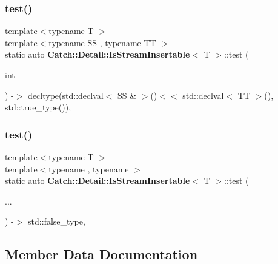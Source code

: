 \subsubsection{test()\hspace{0.1cm}{\footnotesize\ttfamily [1/2]}}
{\footnotesize\ttfamily template$<$typename T $>$ \\
template$<$typename SS , typename TT $>$ \\
static auto \textbf{ Catch\+::\+Detail\+::\+Is\+Stream\+Insertable}$<$ T $>$\+::test (\begin{DoxyParamCaption}\item[{int}]{ }\end{DoxyParamCaption}) -\/$>$  decltype(std\+::declval$<$ SS \& $>$()$<$$<$ std\+::declval$<$ TT $>$(), std\+::true\+\_\+type())\hspace{0.3cm}{\ttfamily [static]}, {\ttfamily [private]}}

\mbox{\label{class_catch_1_1_detail_1_1_is_stream_insertable_ac5761375646929916dc5e165d44cd3d9}} 
\subsubsection{test()\hspace{0.1cm}{\footnotesize\ttfamily [2/2]}}
{\footnotesize\ttfamily template$<$typename T $>$ \\
template$<$typename , typename $>$ \\
static auto \textbf{ Catch\+::\+Detail\+::\+Is\+Stream\+Insertable}$<$ T $>$\+::test (\begin{DoxyParamCaption}\item[{}]{... }\end{DoxyParamCaption}) -\/$>$  std\+::false\+\_\+type\hspace{0.3cm}{\ttfamily [static]}, {\ttfamily [private]}}



\subsection{Member Data Documentation}
\mbox{\label{class_catch_1_1_detail_1_1_is_stream_insertable_a42818b09ae5851126a70ee263769e309}} 
